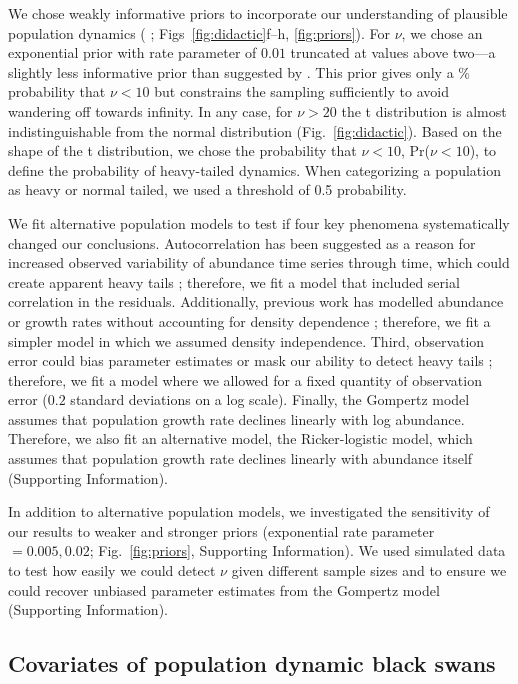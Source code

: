 We chose weakly informative priors to incorporate our understanding of
plausible population dynamics (\citeauthor{gelman2014} \citeyear{gelman2014};
Figs~\ref{fig:didactic}f--h, \ref{fig:priors}). For $\nu$, we chose an
exponential prior with rate parameter of $0.01$ truncated at values above
two---a slightly less informative prior than suggested by
\citet{fernandez1998}. This prior gives only a \basePriorProbHeavy \%
probability that $\nu < 10$ but constrains the sampling sufficiently to avoid
wandering off towards infinity. In any case, for $\nu > 20$ the t distribution
is almost indistinguishable from the normal distribution
(Fig.~\ref{fig:didactic}). Based on the shape of the t distribution, we chose
the probability that $\nu < 10$, Pr($\nu < 10$), to define the probability of
heavy-tailed dynamics. When categorizing a population as heavy or normal tailed,
we used a threshold of 0.5 probability.

We fit alternative population models to test if four key phenomena
systematically changed our conclusions. Autocorrelation has been suggested as
a reason for increased observed variability of abundance time series through
time, which could create apparent heavy tails \citep{inchausti2002};
therefore, we fit a model that included serial correlation in the residuals.
Additionally, previous work has modelled abundance or growth rates without
accounting for density dependence \citep{halley2002,segura2013}; therefore, we
fit a simpler model in which we assumed density independence. Third,
observation error could bias parameter estimates \citep{knape2012} or mask our
ability to detect heavy tails \citep{ward2007}; therefore, we fit a model
where we allowed for a fixed quantity of observation error ($0.2$ standard
deviations on a log scale). Finally, the Gompertz model assumes that
population growth rate declines linearly with log abundance. Therefore, we
also fit an alternative model, the Ricker-logistic model, which assumes that
population growth rate declines linearly with abundance itself (Supporting
Information).

In addition to alternative population models, we investigated the sensitivity
of our results to weaker and stronger priors (exponential rate parameter $=
0.005, 0.02$; Fig.~\ref{fig:priors}, Supporting Information). We used
simulated data to test how easily we could detect $\nu$ given different sample
sizes and to ensure we could recover unbiased parameter estimates from the
Gompertz model (Supporting Information).


\subsection{Covariates of population dynamic black swans}

